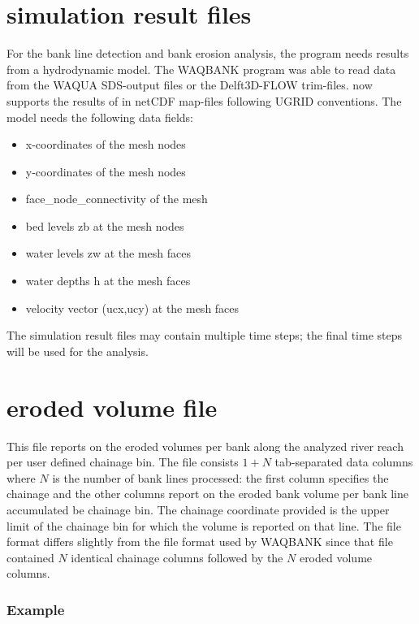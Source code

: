 \section{simulation result files}

For the bank line detection and bank erosion analysis, the program  needs results from a hydrodynamic model.
The WAQBANK program was able to read data from the WAQUA SDS-output files or the Delft3D-FLOW trim-files.
\dfastbe now supports the results of \dflowfm in netCDF map-files following UGRID conventions.
The model needs the following data fields:

\begin{itemize}
\item x-coordinates of the mesh nodes
\item y-coordinates of the mesh nodes
\item face\_node\_connectivity of the mesh
\item bed levels zb at the mesh nodes
\item water levels zw at the mesh faces
\item water depths h at the mesh faces
\item velocity vector (ucx,ucy) at the mesh faces
\end{itemize}

The simulation result files may contain multiple time steps; the final time steps will be used for the analysis.


\section{eroded volume file}

This file reports on the eroded volumes per bank along the analyzed river reach per user defined chainage bin.
The file consists $1+N$ tab-separated data columns where $N$ is the number of bank lines processed: the first column specifies the chainage and the other columns report on the eroded bank volume per bank line accumulated be chainage bin.
The chainage coordinate provided is the upper limit of the chainage bin for which the volume is reported on that line.
The file format differs slightly from the file format used by WAQBANK since that file contained $N$ identical chainage columns followed by the $N$ eroded volume columns.

\subsubsection*{Example}

